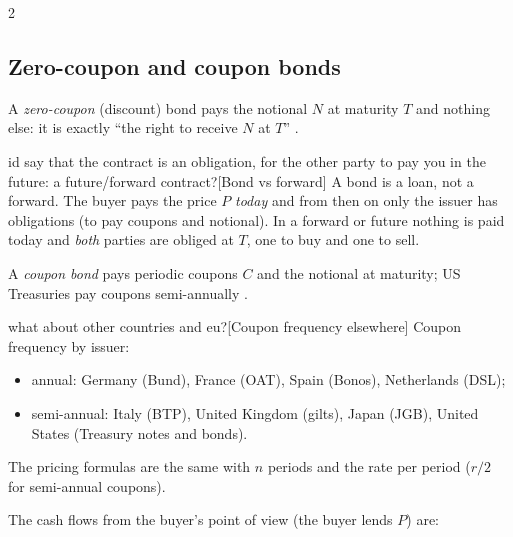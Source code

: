 \begin{paracol}{2}
\subsection{Zero-coupon and coupon bonds}
A \emph{zero-coupon} (discount) bond pays the notional $N$ at maturity $T$ and nothing else: it is
exactly ``the right to receive $N$ at $T$'' .  \begin{answer}{id say that the contract is an obligation, for the other party to pay you in the future: a future/forward contract?}[Bond vs forward]
A bond is a loan, not a forward. The buyer pays the price $P$ \emph{today} and from then on only the
issuer has obligations (to pay coupons and notional). In a forward or future nothing is paid today and
\emph{both} parties are obliged at $T$, one to buy and one to sell.
\end{answer} A \emph{coupon bond} pays
periodic coupons $C$ and the notional at maturity; US Treasuries pay coupons semi-annually
. \begin{answer}{what about other countries and eu?}[Coupon frequency elsewhere]
Coupon frequency by issuer:
\begin{itemize}
  \item annual: Germany (Bund), France (OAT), Spain (Bonos), Netherlands (DSL);
  \item semi-annual: Italy (BTP), United Kingdom (gilts), Japan (JGB), United States (Treasury notes and bonds).
\end{itemize}
The pricing formulas are the same with $n$ periods and the rate per period ($r/2$ for semi-annual coupons).
\end{answer} The cash flows from the buyer's point of view (the buyer lends $P$) are:

\begin{center}
\end{center}



\end{paracol}
